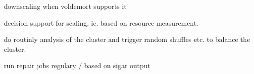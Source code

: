 
downscaling when voldemort supports it

decision support for scaling, ie. based on resource measurement.

do routinly analysis of the cluster and trigger random shuffles etc. to balance the cluster.

run repair jobs regulary / based on sigar output
